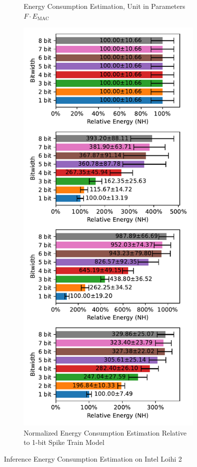 \begin{figure}[H]
\begin{subfigure}[H]{0.495\textwidth}
                \caption{Energy Consumption Estimation, Unit in Parameters $F\cdot E_{\text{MAC}}$}
            \end{subfigure}
            \hfill
            \begin{subfigure}[H]{0.495\textwidth}
                \includegraphics[width=\textwidth]{../standard/DVSGesture/plots/dvsgesture_test_relative_energy_nh.pdf}
                \caption{Normalized Energy Consumption Estimation Relative to 1-bit Spike Train Model}
            \end{subfigure}
            \caption{Inference Energy Consumption Estimation on Intel Loihi 2}
        \end{figure}

